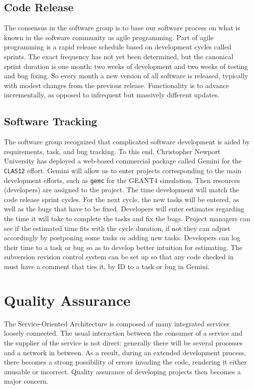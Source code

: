\subsection{Code Release}

The consensus in the software group is to base our software process on what 
is known in the software community as agile programming. Part of agile 
programming is a rapid release schedule based on development cycles called 
sprints.  The exact frequency has not yet been determined, but the canonical 
sprint duration is one month: two weeks of development and two weeks of 
testing and bug fixing. So every month a new version of all software is 
released, typically with modest changes from the previous release. 
Functionality is to advance incrementally, as opposed to infrequent but 
massively different updates.

\subsection{Software Tracking}

The software group recognized that complicated software development is 
aided by requirements, task, and bug tracking. To this end, Christopher 
Newport University has deployed a web-based commercial package called 
Gemini for the {\tt CLAS12} effort. Gemini will allow us to enter projects 
corresponding to the main development efforts, such as {\tt gemc} 
for the GEANT4 simulation. Then resources (developers) are assigned to the 
project. The time development will match the code release sprint cycles. For 
the next cycle, the new tasks will be entered, as well as the bugs that have 
to be fixed.  Developers will enter estimates regarding the time it will take 
to complete the tasks and fix the bugs. Project managers can see if the 
estimated time fits with the cycle duration, if not they can adjust 
accordingly by postponing some tasks or adding new tasks.  Developers can log 
their time to a task or bug so as to develop better intuition for estimating. 
The subversion revision control system can be set up so that any code checked 
in must have a comment that ties it, by ID to a task or bug in Gemini.

\section{Quality Assurance}

The Service-Oriented Architecture is composed of many integrated services 
loosely connected.  The usual interaction between the consumer of a service 
and the supplier of the service is not direct: generally there will be 
several processes and a network in between. As a result, during an extended 
development process, there becomes a strong possibility of errors invading 
the code, rendering it either unusable or incorrect. Quality assurance of 
developing projects then becomes a major concern. 

